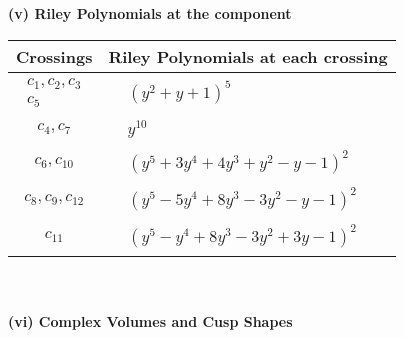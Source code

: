\documentclass[1p]{elsarticle_modified}
\theoremstyle{definition}
\begin{document}
\newpage\renewcommand{\arraystretch}{1}
\flushleft \textbf{(v) Riley Polynomials at the component}\newline \\
\begin{tabular}{m{50pt}|m{274pt}}
Crossings & \hspace{64pt}Riley Polynomials at each crossing \\
\hline $$\begin{aligned}c_{1},c_{2},c_{3}\\c_{5}\end{aligned}$$&$\begin{aligned}
&(y^2+y+1)^5
\end{aligned}$\\
\hline $$\begin{aligned}c_{4},c_{7}\end{aligned}$$&$\begin{aligned}
&y^{10}
\end{aligned}$\\
\hline $$\begin{aligned}c_{6},c_{10}\end{aligned}$$&$\begin{aligned}
&(y^5+3 y^4+4 y^3+y^2- y-1)^2
\end{aligned}$\\
\hline $$\begin{aligned}c_{8},c_{9},c_{12}\end{aligned}$$&$\begin{aligned}
&(y^5-5 y^4+8 y^3-3 y^2- y-1)^2
\end{aligned}$\\
\hline $$\begin{aligned}c_{11}\end{aligned}$$&$\begin{aligned}
&(y^5- y^4+8 y^3-3 y^2+3 y-1)^2
\end{aligned}$\\
\hline
\end{tabular}\\~\\
\newpage\flushleft \textbf{(vi) Complex Volumes and Cusp Shapes}
\end{document}
